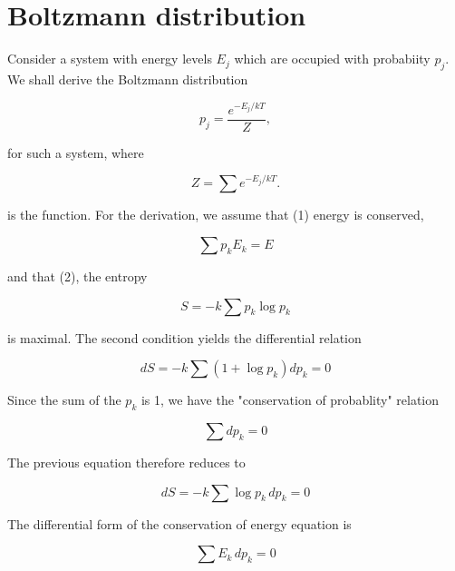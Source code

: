 

\section{Boltzmann distribution}

Consider a system with energy levels $E_j$ which 
are occupied with probabiity $p_j$. We shall
derive the Boltzmann distribution 

\begin{equation}
p_j= \frac{e^{-E_j/kT}}{Z},
\end{equation}

for such a system, where

\begin{equation}
Z = \sum e^{-  E_j/kT}.
\end{equation}

is the  function.  
For the derivation, we assume that (1) energy is conserved,

\begin{equation}
\label{eq:conservedEnergy}
 \sum p_kE_k = E
\end{equation}

and that (2), the entropy

\begin{equation}
S = - k \sum p_k \log p_k
\end{equation}

is maximal.  The second condition yields the differential relation

\begin{equation}
dS = - k \sum (1 +\log p_k)  dp_k = 0
\end{equation}


Since the sum of the $p_k$ is 1, we have the "conservation of probablity" relation

\begin{equation}
\label{eq:consprob}
\sum dp_k = 0
\end{equation}

The previous equation therefore reduces to 

\begin{equation}
\label{eq:diffEntropy}
 dS = -k \sum \log p_k\,  dp_k = 0
\end{equation}



The differential form of the conservation of energy equation is

\begin{equation}
\label{eq:dffConservedEnergy}
 \sum E_k\, d p_k = 0
\end{equation}

